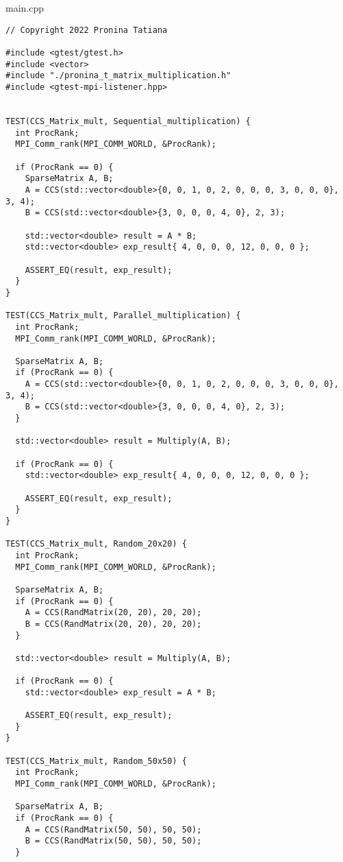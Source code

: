 \documentclass[12pt,a4paper]{article}
\begin{document}
\section{}main.cpp
\begin{lstlisting}
// Copyright 2022 Pronina Tatiana

#include <gtest/gtest.h>
#include <vector>
#include "./pronina_t_matrix_multiplication.h"
#include <gtest-mpi-listener.hpp>


TEST(CCS_Matrix_mult, Sequential_multiplication) {
  int ProcRank;
  MPI_Comm_rank(MPI_COMM_WORLD, &ProcRank);

  if (ProcRank == 0) {
    SparseMatrix A, B;
    A = CCS(std::vector<double>{0, 0, 1, 0, 2, 0, 0, 0, 3, 0, 0, 0}, 3, 4);
    B = CCS(std::vector<double>{3, 0, 0, 0, 4, 0}, 2, 3);

    std::vector<double> result = A * B;
    std::vector<double> exp_result{ 4, 0, 0, 0, 12, 0, 0, 0 };

    ASSERT_EQ(result, exp_result);
  }
}

TEST(CCS_Matrix_mult, Parallel_multiplication) {
  int ProcRank;
  MPI_Comm_rank(MPI_COMM_WORLD, &ProcRank);

  SparseMatrix A, B;
  if (ProcRank == 0) {
    A = CCS(std::vector<double>{0, 0, 1, 0, 2, 0, 0, 0, 3, 0, 0, 0}, 3, 4);
    B = CCS(std::vector<double>{3, 0, 0, 0, 4, 0}, 2, 3);
  }

  std::vector<double> result = Multiply(A, B);

  if (ProcRank == 0) {
    std::vector<double> exp_result{ 4, 0, 0, 0, 12, 0, 0, 0 };

    ASSERT_EQ(result, exp_result);
  }
}

TEST(CCS_Matrix_mult, Random_20x20) {
  int ProcRank;
  MPI_Comm_rank(MPI_COMM_WORLD, &ProcRank);

  SparseMatrix A, B;
  if (ProcRank == 0) {
    A = CCS(RandMatrix(20, 20), 20, 20);
    B = CCS(RandMatrix(20, 20), 20, 20);
  }

  std::vector<double> result = Multiply(A, B);

  if (ProcRank == 0) {
    std::vector<double> exp_result = A * B;

    ASSERT_EQ(result, exp_result);
  }
}

TEST(CCS_Matrix_mult, Random_50x50) {
  int ProcRank;
  MPI_Comm_rank(MPI_COMM_WORLD, &ProcRank);

  SparseMatrix A, B;
  if (ProcRank == 0) {
    A = CCS(RandMatrix(50, 50), 50, 50);
    B = CCS(RandMatrix(50, 50), 50, 50);
  }


\end{lstlisting}
\end{document}
